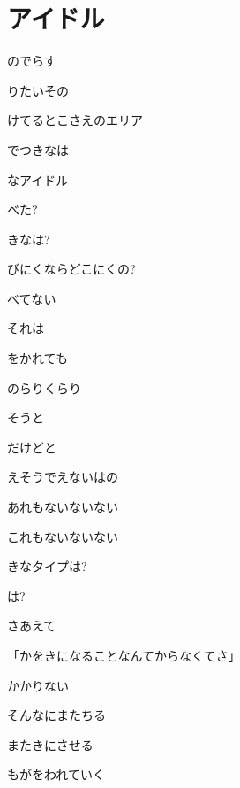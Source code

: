 \section{アイドル}

のでらす

りたいその

けてるとこさえのエリア

でつきなは

なアイドル

\bigskip

べた?

きなは?

びにくならどこにくの?

べてない

それは

をかれても

のらりくらり

\bigskip

そうと

だけどと

えそうでえないはの

あれもないないない

これもないないない

きなタイプは?

は?

さあえて

\bigskip

「かをきになることなんてからなくてさ」

かかりない

そんなにまたちる

またきにさせる

\bigskip

もがをわれていく

